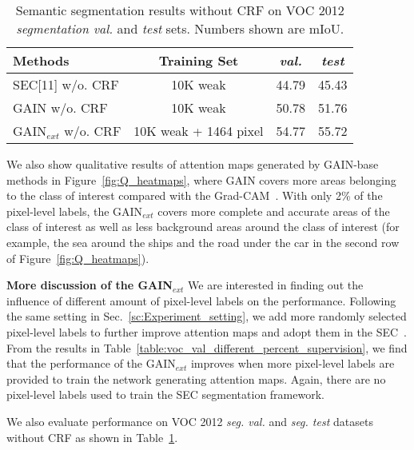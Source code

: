 \documentclass[10pt,twocolumn,letterpaper]{article}
\begin{document}
\begin{table}
 \centering
 \begin{tabular}{lccc}
 \hline
 Methods & Training Set & \emph{val.}  &  \emph{test}\\
 \hline
 SEC[11] w/o. CRF & 10K weak & 44.79 & 45.43\\
 GAIN w/o. CRF & 10K weak  & 50.78 & 51.76\\
 GAIN$_{ext}$ w/o. CRF & 10K weak + 1464 pixel & 54.77 & 55.72\\
 \hline
 \end{tabular}
 \caption{Semantic segmentation results without CRF on VOC 2012 \textit{segmentation val.} and \textit{test} sets. Numbers shown are mIoU.}
 \label{table:voc_ablation_results}
 \end{table}

We also show qualitative results of attention maps generated by GAIN-base methods in Figure~\ref{fig:Q_heatmaps}, where GAIN covers more areas belonging to the class of interest compared with the Grad-CAM~\cite{grad-cam}. With only 2\% of the pixel-level labels, the GAIN$_{ext}$ covers more complete and accurate areas of the class of interest as well as less background areas around the class of interest (for example, the sea around the ships and the road under the car in the second row of Figure~\ref{fig:Q_heatmaps}).



\textbf{More discussion of the GAIN$_{ext}$} We are interested in finding out the influence of different amount of pixel-level labels on the performance. Following the same setting in Sec.~\ref{sc:Experiment_setting}, we add more randomly selected pixel-level labels to further improve attention maps and adopt them in the SEC~\cite{kolesnikov2016seed}. From the results in Table~\ref{table:voc_val_different_percent_supervision}, we find that the performance of the GAIN$_{ext}$ improves when more pixel-level labels are provided to train the network generating attention maps. Again, there are no pixel-level labels used to train the SEC segmentation framework.

We also evaluate performance on VOC 2012 \textit{seg. val.} and \textit{seg. test} datasets without CRF as shown in Table~\ref{table:voc_ablation_results}.
\end{document}
